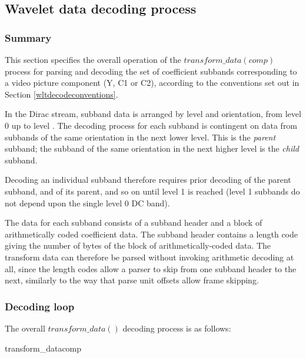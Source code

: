 \subsection{Wavelet data decoding process}

\subsubsection{Summary}

\label{transformdata}

This section specifies the overall operation of the $transform\_data(comp)$ process
for parsing and decoding the set of coefficient subbands corresponding
to a video picture component (Y, C1 or C2), according to the conventions set out
in Section \ref{wltdecodeconventions}.

In the Dirac stream, subband data is arranged by level and orientation, from
level 0 up to level \TransformDepth. The decoding process for each subband is
contingent on data from subbands of the same orientation in the next lower level.
This is the {\em parent} subband; the subband of the same orientation in the next
higher level is the {\em child} subband. 

Decoding an individual subband therefore requires prior decoding of the parent subband,
and of its parent, and so on until level 1 is reached (level 1 subbands do not depend
upon the single level 0 DC band).

\begin{informative}
The data for each subband consists of a subband header and a block of arithmetically
coded coefficient data. The subband header contains a length code giving the number of
bytes of the block of arithmetically-coded data. The transform data can therefore be
parsed without invoking arithmetic decoding at all, since the length codes allow a 
parser to skip from one subband header to the next, similarly to the way that parse unit
offsets allow frame skipping.
\end{informative}

\subsubsection{Decoding loop}

The overall $transform\_data()$ decoding process is as follows:

\begin{pseudo}{transform\_data}{comp}
  \bsEND
\bsEND
{}
\end{pseudo}

